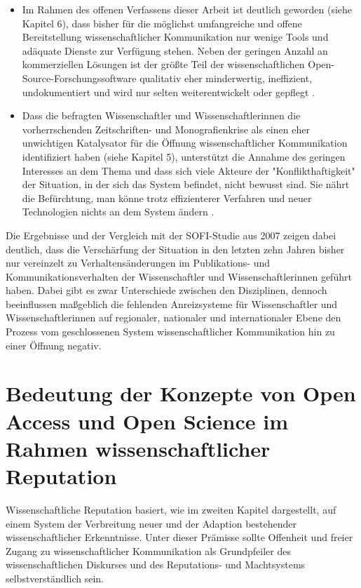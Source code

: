 \begin{itemize}
\item Im Rahmen des offenen Verfassens dieser Arbeit ist deutlich geworden (siehe Kapitel 6), dass bisher für die möglichst umfangreiche und offene Bereitstellung wissenschaftlicher Kommunikation nur wenige Tools und adäquate Dienste zur Verfügung stehen. Neben der geringen Anzahl an kommerziellen Lösungen ist der größte Teil der wissenschaftlichen Open-Source-Forschungssoftware qualitativ eher minderwertig, ineffizient, undokumentiert und wird nur selten weiterentwickelt oder gepflegt \cite{Hey_2015}.
\item Dass die befragten Wissenschaftler und Wissenschaftlerinnen die vorherrschenden Zeitschriften- und Monografienkrise als einen eher unwichtigen Katalysator für die Öffnung wissenschaftlicher Kommunikation identifiziert haben (siehe Kapitel 5), unterstützt die Annahme des geringen Interesses an dem Thema und dass sich viele Akteure der "Konflikthaftigkeit" \cite{Kaldewey_2010} der Situation, in der sich das System befindet, nicht bewusst sind. Sie nährt die Befürchtung, man könne trotz effizienterer Verfahren und neuer Technologien nichts an dem System ändern \cite{Parks_2002}.
\end{itemize}

Die Ergebnisse und der Vergleich mit der SOFI-Studie aus 2007 zeigen dabei deutlich, dass die Verschärfung der Situation in den letzten zehn Jahren bisher nur vereinzelt zu Verhaltensänderungen im Publikations- und Kommunikationsverhalten der Wissenschaftler und Wissenschaftlerinnen geführt haben. Dabei gibt es zwar Unterschiede zwischen den Disziplinen, dennoch beeinflussen maßgeblich die fehlenden Anreizsysteme für Wissenschaftler und Wissenschaftlerinnen auf regionaler, nationaler und internationaler Ebene den Prozess vom geschlossenen System wissenschaftlicher Kommunikation hin zu einer Öffnung negativ.

\section{Bedeutung der Konzepte von Open Access und Open Science im Rahmen wissenschaftlicher Reputation}

Wissenschaftliche Reputation basiert, wie im zweiten Kapitel dargestellt, auf einem System der Verbreitung neuer und der Adaption bestehender wissenschaftlicher Erkenntnisse. Unter dieser Prämisse sollte Offenheit und freier Zugang zu wissenschaftlicher Kommunikation als Grundpfeiler des wissenschaftlichen Diskurses und des Reputations- und Machtsystems selbstverständlich sein.


